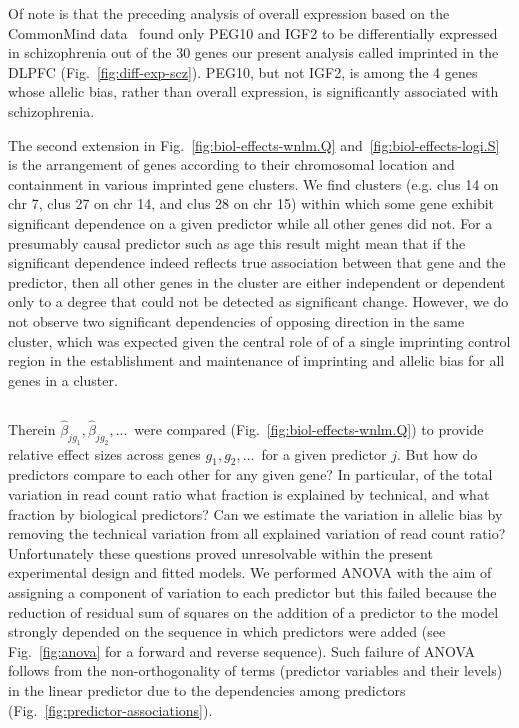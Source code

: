 \documentclass[letterpaper]{article}
\begin{document}
Of note is that the preceding analysis of overall expression based on the
CommonMind data~\cite{Fromer2016a} found only PEG10 and IGF2 to be
differentially expressed in schizophrenia out of the 30 genes our present
analysis called imprinted in the DLPFC (Fig.~\ref{fig:diff-exp-scz}). PEG10,
but not IGF2, is among the 4 genes whose allelic bias, rather than overall
expression, is significantly associated with schizophrenia.

The second extension in Fig.~\ref{fig:biol-effects-wnlm.Q}
and~\ref{fig:biol-effects-logi.S} is the arrangement of genes according to
their chromosomal location and containment in various imprinted gene clusters.
We find clusters (e.g. clus 14 on chr 7, clus 27 on chr 14, and clus 28 on
chr 15) within which some gene exhibit significant dependence on a given
predictor while all other genes did not. For a presumably causal predictor such
as age this result might mean that if the significant dependence indeed
reflects true association between that gene and the predictor, then all other
genes in the cluster are either independent or dependent only to a degree that
could not be detected as significant change. However, we do not observe two
significant dependencies of opposing direction in the same cluster, which was
expected given the central role of of a single imprinting control region in
the establishment and maintenance of imprinting and allelic bias for all
genes in a cluster.

\subsection{}
\label{sec:limitations}

Therein \(\hat\beta_{jg_1},
\hat\beta_{jg_2},...\)~were compared (Fig.~\ref{fig:biol-effects-wnlm.Q}) to
provide relative effect sizes across genes \(g_1, g_2,...\)~for a given
predictor \(j\). But how do predictors compare to each other for any given
gene? In particular, of the total variation in read count ratio what fraction
is explained by technical, and what fraction by biological predictors? Can we
estimate the variation in allelic bias by removing the technical variation
from all explained variation of read count ratio?  Unfortunately these
questions proved unresolvable within the present experimental design and
fitted models. We performed ANOVA with the aim of assigning a component of
variation to each predictor but this failed because the reduction of residual
sum of squares on the addition of a predictor to the model strongly depended
on the sequence in which predictors were added (see Fig.~\ref{fig:anova} for a
forward and reverse sequence). Such failure of ANOVA follows from
the non-orthogonality of terms (predictor variables and their levels) in the
linear predictor due to the dependencies among predictors
(Fig.~\ref{fig:predictor-associations}).
\end{document}
